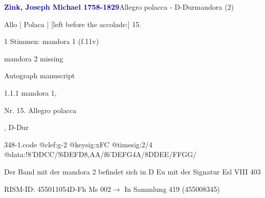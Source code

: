 \documentclass[twocolumn, 12pt]{book}
\begin{document}
\par \vspace{16pt} \textcolor{darkblue}{\textbf{Zink, Joseph Michael  1758-1829}}\hfillplus{\textbf{[348]}}\newline Allegro polacca - D-Dur\newline mandora (2)
\par \begin{itshape}[f.11v, at left:] Allo | Polaca | [left before the accolade:] 15.\end{itshape} 
\par \textcolor{darkblue}{}  1 Stimmen: mandora 1  (f.11v)\newline \begin{small} mandora 2 missing\end{small} \newline Autograph manuscript
\par 1.1.1  mandora 1, \begin{itshape}Nr. 15. Allegro polacca\end{itshape}, D-Dur  
\begin{filecontents*}{348-1.code}
@clef:g-2
@keysig:xFC
@timesig:2/4
@data:!8'DDCC/!6DEFD{8,AA}/f6'DEFG4A/8DDEE/FFGG/
\end{filecontents*}
\newline %
\par Der Band mit der mandora 2 befindet sich in D Eu mit der Signatur Esl VIII 403
\par RISM-ID: 455011054\newline D-Fh  Ms 002\newline $\rightarrow$ In Sammlung 419 (455008345)
      
\end{document}
